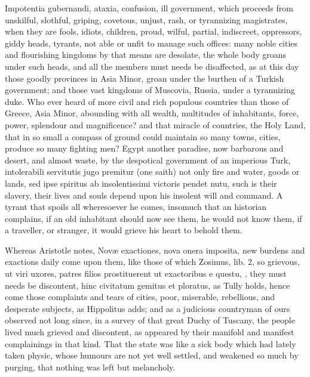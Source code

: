 {Impotentia gubernandi, ataxia, confusion, ill government, which
proceeds from unskilful, slothful, griping, covetous, unjust, rash, or
tyrannizing magistrates, when they are fools, idiots, children, proud,
wilful, partial, indiscreet, oppressors, giddy heads, tyrants, not able
or unfit to manage such offices: many noble cities and flourishing
kingdoms by that means are desolate, the whole body groans under such
heads, and all the members must needs be disaffected, as at this day
those goodly provinces in Asia Minor, \etc{} groan under the burthen of a
Turkish government; and those vast kingdoms of Muscovia, Russia,
under a tyrannizing duke. Who ever heard of more civil and rich
populous countries than those of Greece, Asia Minor, abounding with all
wealth, multitudes of inhabitants, force, power, splendour and
magnificence? and that miracle of countries, the Holy Land, that
in so small a compass of ground could maintain so many towns, cities,
produce so many fighting men? Egypt another paradise, now barbarous and
desert, and almost waste, by the despotical government of an imperious
Turk, intolerabili servitutis jugo premitur (one saith) not only
fire and water, goods or lands, sed ipse spiritus ab insolentissimi
victoris pendet nutu, such is their slavery, their lives and souls
depend upon his insolent will and command. A tyrant that spoils all
wheresoever he comes, insomuch that an historian complains, if an
old inhabitant should now see them, he would not know them, if a
traveller, or stranger, it would grieve his heart to behold them.

Whereas Aristotle notes, Nov\ae{} exactiones, nova onera imposita,
new burdens and exactions daily come upon them, like those of which
Zosimus, lib. 2, so grievous, ut viri uxores, patres filios
prostituerent ut exactoribus e questu, \etc{}, they must needs be
discontent, hinc civitatum gemitus et ploratus, as  Tully holds,
hence come those complaints and tears of cities, poor, miserable,
rebellious, and desperate subjects, as Hippolitus adds; and
as a judicious countryman of ours observed not long since, in a
survey of that great Duchy of Tuscany, the people lived much grieved
and discontent, as appeared by their manifold and manifest complainings
in that kind. That the state was like a sick body which had lately
taken physic, whose humours are not yet well settled, and weakened so
much by purging, that nothing was left but melancholy.

}
